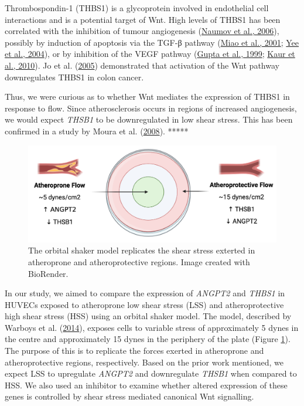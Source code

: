 \documentclass[
  11pt,
]{article}
\begin{document}
Thrombospondin-1 (THBS1) is a glycoprotein involved in endothelial cell interactions and is a potential target of Wnt.
High levels of THBS1 has been correlated with the inhibition of tumour angiogenesis (\protect\hyperlink{ref-naumov2006}{Naumov et al., 2006}), possibly by induction of apoptosis via the TGF-β pathway (\protect\hyperlink{ref-Miao2001}{Miao et al., 2001}; \protect\hyperlink{ref-yee2004}{Yee et al., 2004}), or by inhibition of the VEGF pathway (\protect\hyperlink{ref-gupta1999}{Gupta et al., 1999}; \protect\hyperlink{ref-kaur2010}{Kaur et al., 2010}).
Jo et al. (\protect\hyperlink{ref-jo2005}{2005}) demonstrated that activation of the Wnt pathway downregulates THBS1 in colon cancer.

Thus, we were curious as to whether Wnt mediates the expression of THBS1 in response to flow.
Since atherosclerosis occurs in regions of increased angiogenesis, we would expect \emph{THSB1} to be downregulated in low shear stress.
This has been confirmed in a study by Moura et al. (\protect\hyperlink{ref-Moura2008}{2008}).
*****

\begin{figure}

{\centering \includegraphics[width=0.8\linewidth]{../images/orbital} 

}

\caption{The orbital shaker model replicates the shear stress exterted in atheroprone and atheroprotective regions. Image created with BioRender.}\label{fig:orbital}
\end{figure}

In our study, we aimed to compare the expression of \emph{ANGPT2} and \emph{THBS1} in HUVECs exposed to atheroprone low shear stress (LSS) and atheroprotective high shear stress (HSS) using an orbital shaker model.
The model, described by Warboys et al. (\protect\hyperlink{ref-Warboys2014}{2014}), exposes cells to variable stress of approximately 5 dynes in the centre and approximately 15 dynes in the periphery of the plate (Figure \ref{fig:orbital}).
The purpose of this is to replicate the forces exerted in atheroprone and atheroprotective regions, respectively.
Based on the prior work mentioned, we expect LSS to upregulate \emph{ANGPT2} and downregulate \emph{THSB1} when compared to HSS.
We also used an inhibitor to examine whether altered expression of these genes is controlled by shear stress mediated canonical Wnt signalling.
\end{document}
